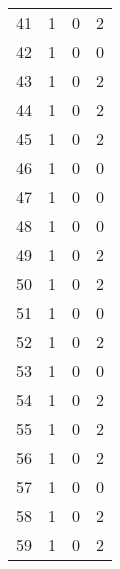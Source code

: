 \begin{longtable}{cp{3cm}p{3cm}p{3cm}}
41 &                      1 &                      0 &                      2 \\
42 &                      1 &                      0 &                      0 \\
43 &                      1 &                      0 &                      2 \\
44 &                      1 &                      0 &                      2 \\
45 &                      1 &                      0 &                      2 \\
46 &                      1 &                      0 &                      0 \\
47 &                      1 &                      0 &                      0 \\
48 &                      1 &                      0 &                      0 \\
49 &                      1 &                      0 &                      2 \\
50 &                      1 &                      0 &                      2 \\
51 &                      1 &                      0 &                      0 \\
52 &                      1 &                      0 &                      2 \\
53 &                      1 &                      0 &                      0 \\
54 &                      1 &                      0 &                      2 \\
55 &                      1 &                      0 &                      2 \\
56 &                      1 &                      0 &                      2 \\
57 &                      1 &                      0 &                      0 \\
58 &                      1 &                      0 &                      2 \\
59 &                      1 &                      0 &                      2 \\
\end{longtable}
